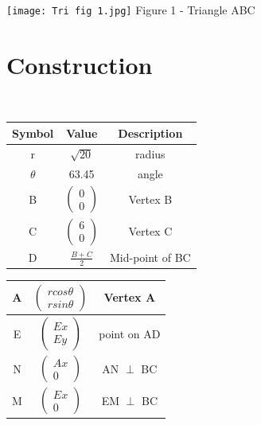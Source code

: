 \documentclass[journal,12pt,twocolumn]{IEEEtran}
\begin{document}
\centering
\texttt{[image: Tri fig 1.jpg]}
Figure 1 - Triangle ABC

\section{Construction}
\
\centering
\begin{tabular}{|c|c|c|}
\hline
\textbf{Symbol} & \textbf{Value} & \textbf{Description} \\
\hline
r & $\sqrt{20}$ & radius\\
\hline
$\theta$ & 63.45 & angle\\
\hline
B & $\begin{pmatrix} 0 \\ 0 \end{pmatrix}$ & Vertex B\\

\hline
C & $\begin{pmatrix}6 \\0 \end{pmatrix}$ & Vertex C\\
\hline

D & $\frac{B+C}{2}$ & Mid-point of BC\\
 
\hline

\end{tabular}

\centering
\begin{tabular}{|c|c|c|}

\hline

A & $\begin{pmatrix} rcos\theta \\ rsin\theta \end{pmatrix}$ & Vertex A\\

\hline

E & $\begin{pmatrix}Ex \\Ey \end{pmatrix}$ & point on AD\\

\hline

N & $\begin{pmatrix}Ax \\ 0 \end{pmatrix}$ & AN $\perp$ BC\\

\hline

M & $\begin{pmatrix}Ex \\ 0 \end{pmatrix}$ & EM $\perp$ BC\\

\hline

\end{tabular}
\end{document}
